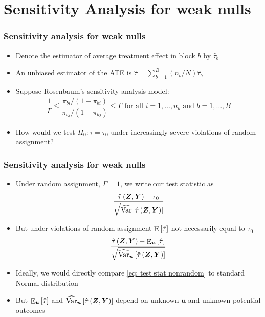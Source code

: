 \documentclass[table, xcolor = {dvipsnames}, 9pt]{beamer}
\theoremstyle{plain}
\DeclareMathOperator{\E}{\rm{E}}
\DeclareMathOperator{\Var}{\rm{Var}}
\begin{document}
\section{Sensitivity Analysis for weak nulls}
\begin{frame}
\frametitle{Sensitivity analysis for weak nulls} 
\vfill
\begin{itemize} \vfill
\item Denote the estimator of average treatment effect in block $b$ by $\hat{\tau}_b$ \vfill
\item An unbiased estimator of the ATE is $\hat{\tau} = \sum \limits_{b = 1}^B (n_b/N)\hat{\tau}_b$ \vfill
\item Suppose Rosenbaum's sensitivity analysis model: \vfill
\begin{align*}
\dfrac{1}{\Gamma} \leq \dfrac{\pi_{bi}/(1 - \pi_{bi})}{\pi_{bj} / (1 - \pi_{bj})} \leq \Gamma \text{ for all } i = 1, \ldots , n_b \text{ and } b = 1, \ldots , B 
\end{align*} \vfill
\item How would we test $H_0: \tau = \tau_0$ under increasingly severe violations of random assignment? \vfill
\end{itemize}  
\vfill
\end{frame}
\begin{frame}[t]
\frametitle{Sensitivity analysis for weak nulls} 
\vfill
\begin{itemize} \vfill
\item Under random assignment, $\Gamma = 1$, we write our test statistic as \vfill
\begin{align*}
\frac{\hat{\tau}\left(\bm{Z}, \bm{Y}\right) - \tau_0}{\sqrt{\widehat{\Var}\left[\hat{\tau}\left(\bm{Z}, \bm{Y}\right)\right]}}
\end{align*} \vfill
\item But under violations of random assignment $\E\left[\hat{\tau}\right]$ not necessarily equal to $\tau_0$ \vfill
\begin{align} \label{eq: test stat nonrandom}
\frac{\hat{\tau}\left(\bm{Z}, \bm{Y}\right) - \E_{\bm{u}}\left[\hat{\tau}\right]}{\sqrt{\widehat{\Var}_{\bm{u}}\left[\hat{\tau}\left(\bm{Z}, \bm{Y}\right)\right]}}
\end{align} \vfill
\item Ideally, we would directly compare \eqref{eq: test stat nonrandom} to standard Normal distribution \vfill
\item But $\E_{\bm{u}}\left[\hat{\tau}\right]$ and $\widehat{\Var}_{\bm{u}}\left[\hat{\tau}\left(\bm{Z}, \bm{Y}\right)\right]$ depend on unknown $\bm{u}$ and unknown potential outcomes
\end{itemize}  
\vfill
\end{frame}
\end{document}
